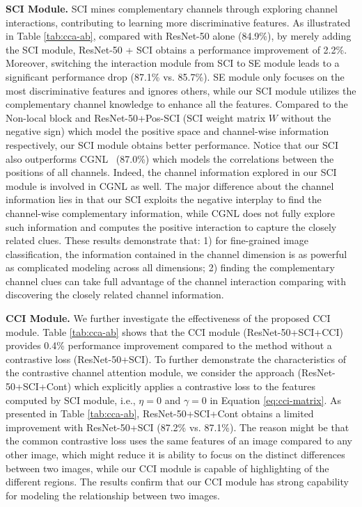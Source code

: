 \documentclass[letterpaper]{article} \usepackage{aaai20}  \usepackage{times}  \usepackage{helvet} \usepackage{courier}  \usepackage[hyphens]{url}  \usepackage{graphicx} \urlstyle{rm} \def\UrlFont{\rm}  \usepackage{graphicx}  \frenchspacing  \setlength{\pdfpagewidth}{8.5in}  \setlength{\pdfpageheight}{11in}  \usepackage{amsmath,amssymb}
\begin{document}
\textbf{SCI Module.}
SCI mines complementary channels through exploring channel interactions, contributing to learning more discriminative features.
As illustrated in Table \ref{tab:cca-ab}, compared with ResNet-50 alone (84.9\%), by merely adding the SCI module, ResNet-50 + SCI obtains a performance improvement of 2.2\%. Moreover, switching the interaction module from SCI to SE module leads to a significant performance drop (87.1\% vs. 85.7\%).
SE module only focuses on the most discriminative features and ignores others, while our SCI module utilizes the complementary channel knowledge to enhance all the features.
Compared to the Non-local block and ResNet-50+Pos-SCI (SCI weight matrix $W$ without the negative sign) which model the positive space and channel-wise information respectively, our SCI module obtains better performance.
 Notice that our SCI also outperforms
CGNL~\cite{yue2018compact} (87.0\%) which models the correlations between the positions of all channels.
Indeed, the channel information explored in our SCI module is involved in CGNL as well.
The major difference about the channel information lies in that our SCI exploits the negative interplay to find the channel-wise complementary  information, while CGNL does not fully explore such information and computes the positive interaction to capture the closely related clues.
These results demonstrate that: 1) for fine-grained image classification, the information contained in the channel dimension is as powerful as complicated modeling across all dimensions; 2) finding the complementary channel clues can take full advantage of the channel interaction comparing with discovering the closely related channel information.

\textbf{CCI Module.} We further investigate the effectiveness of the proposed CCI module.
Table \ref{tab:cca-ab} shows that the CCI module (ResNet-50+SCI+CCI) provides 0.4\% performance improvement compared to the method without a contrastive loss (ResNet-50+SCI).
To further demonstrate the characteristics of the contrastive channel attention module, we consider the approach (ResNet-50+SCI+Cont) which explicitly applies a contrastive loss to the features computed by SCI module, i.e., $\eta=0$ and $\gamma=0$ in Equation \ref{eq:cci-matrix}.
As presented in Table \ref{tab:cca-ab}, ResNet-50+SCI+Cont obtains a limited improvement with ResNet-50+SCI (87.2\% vs. 87.1\%).
The reason might be that the common contrastive loss uses the same features of an image compared to any other image, which might reduce it is ability to focus on the distinct differences between two images, while our CCI module is capable of highlighting of the different regions.
The results confirm that our CCI module has strong capability for modeling the relationship between two images.
\end{document}
